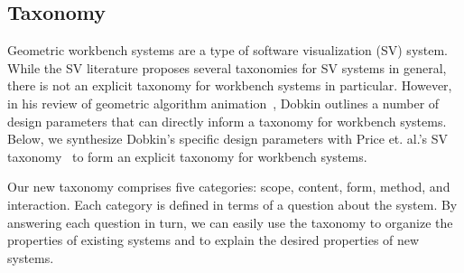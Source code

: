 \subsection{Taxonomy} 



Geometric workbench systems are a type of software visualization (SV) system.
While the SV literature proposes several taxonomies for SV systems in general,
there is not an explicit taxonomy for workbench systems in particular. However,
in his review of geometric algorithm animation~\cite{hausner1999animation},
Dobkin outlines a number of design parameters that can directly inform a
taxonomy for workbench systems. Below, we synthesize Dobkin's specific design
parameters with Price et. al.'s SV taxonomy~\cite{price1993principled} to form
an explicit taxonomy for workbench systems. 

Our new taxonomy comprises five categories: scope, content, form, method, and
interaction. Each category is defined in terms of a question about the system.
By answering each question in turn, we can easily use the taxonomy to organize
the properties of existing systems and to explain the desired properties of new
systems.



